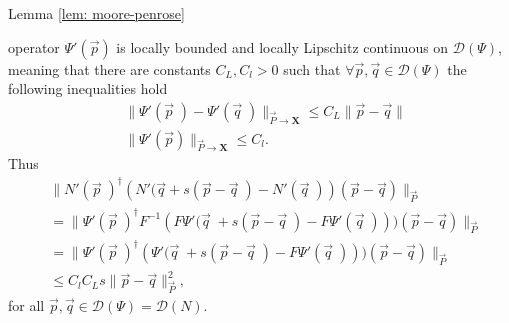 \begin{myproof}{Lemma \ref{lem: moore-penrose}}
\begin{enumerate}
            operator $\Psi'(\vec{p})$ is locally bounded and locally
            Lipschitz continuous on $\mathcal{D}(\Psi)$, meaning that there are
            constants $C_L, C_l > 0$ such that $\forall \vec{p}, \vec{q} \in
            \mathcal{D}(\Psi)$ the following inequalities hold
            \begin{align}
                &\big\|\Psi'(\vec{p}\;) - \Psi'(\vec{q}\;)
                \big\|_{\vec{P}\to\mathbf{X}} \leq C_L \|\vec{p} - \vec{q} \|
                \\
                &\big\|\Psi'(\vec{p}) \big\|_{\vec{P} \to \mathbf{X}} \le
                C_l.
            \end{align}
            Thus
            \begin{align}
                &\Big\| N'(\vec{p}\;)^{\dagger}\left( N'(\vec{q} + s(\vec{p} -
                \vec{q}\;) - N'(\vec{q}\;)\right)
                (\vec{p} - \vec{q}) \Big\|_{\vec{P}} \\
                &= \Big\|
                \Psi'(\vec{p}\;)^{\dagger}F^{-1}\left( F\Psi'(\vec{q}\;
                + s\left( \vec{p} - \vec{q}\; \right)-F\Psi'(\vec{q}\;)
            \right)) \left(\vec{p} - \vec{q}  \right) \Big\|_{\vec{P}}
            \nonumber \\
                &= \Big\|
                \Psi'(\vec{p}\;)^{\dagger}\left(\Psi'(\vec{q}\;
                + s\left( \vec{p} - \vec{q}\; \right)-F\Psi'(\vec{q}\;)
            \right)) \left(\vec{p} - \vec{q}  \right) \Big\|_{\vec{P}}
            \nonumber\\
                &\leq C_lC_L s \|\vec{p} - \vec{q} \|^{2}_{\vec{P}},
                \nonumber
            \end{align}
        for all $\vec{p}, \vec{q} \in \mathcal{D}(\Psi) = \mathcal{D}(N)$.

    \end{enumerate}

\end{myproof}

